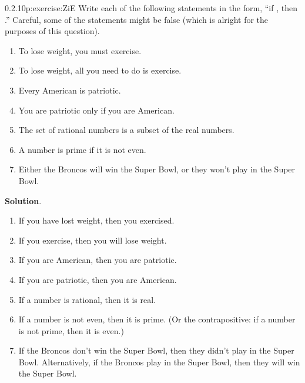 \documentclass[twoside,11pt,]{book}
\newcommand{\blocktitlefont}{\relax}
\numberwithin{equation}{chapter}
\begin{document}
\begin{divisionsolution}{0.2.10}{}{p:exercise:ZiE}%
Write each of the following statements in the form, ``if \textellipsis{}, then \textellipsis{}.'' Careful, some of the statements might be false (which is alright for the purposes of this question).%
\begin{enumerate}[label=(\alph*)]
\item{}To lose weight, you must exercise.%
\item{}To lose weight, all you need to do is exercise.%
\item{}Every American is patriotic.%
\item{}You are patriotic only if you are American.%
\item{}The set of rational numbers is a subset of the real numbers.%
\item{}A number is prime if it is not even.%
\item{}Either the Broncos will win the Super Bowl, or they won't play in the Super Bowl.%
\end{enumerate}
%
\par\smallskip%
\noindent\textbf{\blocktitlefont Solution}.\quad{}%
\begin{enumerate}[label=(\alph*)]
\item{}If you have lost weight, then you exercised.%
\item{}If you exercise, then you will lose weight.%
\item{}If you are American, then you are patriotic.%
\item{}If you are patriotic, then you are American.%
\item{}If a number is rational, then it is real.%
\item{}If a number is not even, then it is prime. (Or the contrapositive: if a number is not prime, then it is even.)%
\item{}If the Broncos don't win the Super Bowl, then they didn't play in the Super Bowl. Alternatively, if the Broncos play in the Super Bowl, then they will win the Super Bowl.%
\end{enumerate}
%
\end{divisionsolution}%
\end{document}
